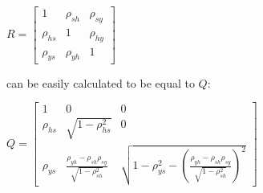 \documentclass[]{elsarticle}
\begin{document}
\begin{appendix}
\begin{center}
	$R = \begin{bmatrix}
					1 & \rho_{sh} & \rho_{sy} \\
					\rho_{hs} & 1 & \rho_{hy} \\
					\rho_{ys} & \rho_{yh} & 1
			\end{bmatrix}
	$
\end{center}

can be easily calculated to be equal to $Q$:

\begin{center}
	$Q = \begin{bmatrix}
					1 & 0 & 0 \\
					\rho_{hs} & \sqrt{1-\rho^2_{hs}} & 0 \\
					\rho_{ys} & \frac{\rho_{yh} - \rho_{sh}\rho_{sy}}{\sqrt{1-\rho^2_{sh}}} & \sqrt{1-\rho^2_{ys}-(\frac{\rho_{yh} - \rho_{sh}\rho_{sy}}{\sqrt{1-\rho^2_{sh}}})^2}
			\end{bmatrix}
	$
\end{center}




\end{appendix}
\end{document}
